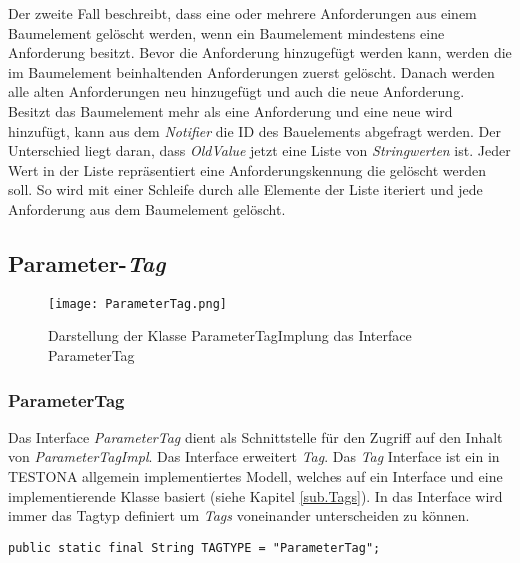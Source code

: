 Der zweite Fall beschreibt, dass eine oder mehrere Anforderungen aus einem Baumelement gelöscht werden, wenn ein Baumelement mindestens eine Anforderung besitzt. Bevor die Anforderung hinzugefügt werden kann, werden die im Baumelement beinhaltenden Anforderungen zuerst gelöscht. Danach werden alle alten Anforderungen neu hinzugefügt und auch die neue Anforderung.\\


Besitzt das Baumelement mehr als eine Anforderung und eine neue wird hinzufügt, kann aus dem \textit{Notifier} die ID des Bauelements abgefragt werden. Der Unterschied liegt daran, dass \textit{OldValue} jetzt eine Liste von \textit{Stringwerten} ist. Jeder Wert in der Liste repräsentiert eine Anforderungskennung die gelöscht werden soll. So wird mit einer Schleife durch alle Elemente der Liste iteriert und jede Anforderung aus dem Baumelement gelöscht.\\



\subsection{Parameter-\textit{Tag}}\label{sub.ParameterTag}


\begin{figure}[h!]
  \begin{center}
    \texttt{[image: ParameterTag.png]}
  		  \caption{Darstellung der Klasse ParameterTagImplung das Interface ParameterTag}
     \label{uml.ParameterTag}
  \end{center}
\end{figure}






\subsubsection{ParameterTag}
Das Interface \textit{ParameterTag} dient als Schnittstelle für den Zugriff auf den Inhalt von \textit{ParameterTagImpl}. Das Interface erweitert \textit{Tag}. Das \textit{Tag} Interface ist ein in TESTONA allgemein implementiertes Modell, welches auf ein Interface und eine implementierende Klasse basiert (siehe Kapitel \ref{sub.Tags}). In das Interface wird immer das Tagtyp definiert um \textit{Tags} voneinander unterscheiden zu können.

\begin{lstlisting}
public static final String TAGTYPE = "ParameterTag";
\end{lstlisting}

